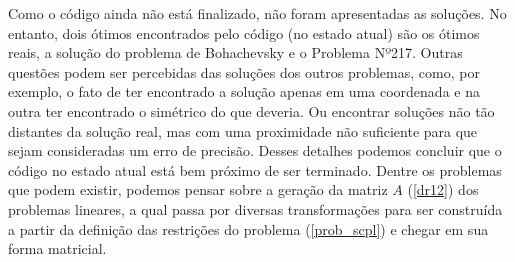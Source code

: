 Como o código ainda não está finalizado, não foram apresentadas as soluções. No entanto,
dois ótimos encontrados pelo código (no estado atual) são os ótimos reais, a solução do
problema de Bohachevsky e o Problema Nº217. Outras questões podem ser percebidas das
soluções dos outros problemas, como, por exemplo, o fato de ter encontrado a solução
apenas em uma coordenada e na outra ter encontrado o simétrico do que deveria. Ou
encontrar soluções não tão distantes da solução real, mas com uma proximidade não
suficiente para que sejam consideradas um erro de precisão. Desses detalhes podemos
concluir que o código no estado atual está bem próximo de ser terminado. Dentre os
problemas que podem existir, podemos pensar sobre a geração da matriz \(A\) (\ref{dr12})
dos problemas lineares, a qual passa por diversas transformações para ser construída
a partir da definição das restrições do problema (\ref{prob_scpl}) e chegar em sua forma
matricial.